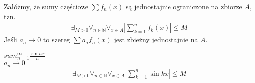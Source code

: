\begin{twr}
	Załóżmy, że sumy częściowe $ \sum f_n(x) $ są jednostajnie ograniczone na zbiorze $ A $, tzn.
	\begin{gather*}
	\exists_{M>0}\forall_{n\in \mathbb N }\forall_{x\in A}\left|\sum_{k=1}^{n}f_k(x)\right|\le M
	\end{gather*}
	Jeśli $ a_n\to0 $ to szereg $ \sum a_nf_n(x) $ jest zbieżny jednostajnie na $ A $.
\end{twr}
\begin{prz}
	$ sum_{n=1}^{\infty }\frac{\sin nx}{n} $\\
	$ a_n\to0 $
	\begin{gather*}
	\exists_{M>0}\forall_{n\in \mathbb N }\forall_{x\in A} \left|\sum_{k=1}^{n}\sin kx\right|\le M
	\end{gather*}
\end{prz}